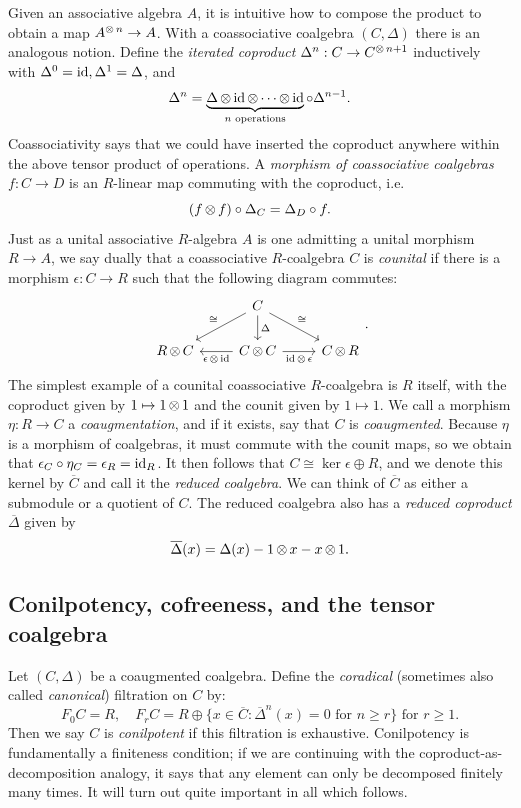 Given an associative algebra $A$, it is intuitive how to compose the product to obtain a map $A^{\operatorname{\otimes} n} \to A$. With a coassociative coalgebra $(C,\Delta)$ there is an analogous notion. Define the \emph{iterated coproduct} $\Delta^n: C\to C^{\operatorname{\otimes} n+1}$ inductively with $\Delta^0 = \operatorname{id}, \Delta^1 = \Delta$, and 
\[\Delta^n = \underbrace{\Delta \operatorname{\otimes} \operatorname{id} \operatorname{\otimes} \cdots \operatorname{\otimes} \operatorname{id}}_{\text{$n$ operations}} \circ \Delta^{n-1}.\]
Coassociativity says that we could have inserted the coproduct anywhere within the above tensor product of operations.
A \textit{morphism of coassociative coalgebras} $f: C\to D$ is an $R$-linear map commuting with the coproduct, i.e. 
\[(f\operatorname{\otimes} f)\circ \Delta_C = \Delta_D \circ f.\]
Just as a unital associative $R$-algebra $A$ is one admitting a unital morphism $R\to A$, we say dually that a coassociative $R$-coalgebra $C$ is \textit{counital} if there is a morphism $\epsilon: C\to R$ such that the following diagram commutes:
\[\begin{tikzcd}
	& C \\
	{R\tensor C} & {C\tensor C} & {C\tensor R}
	\arrow["\cong"', from=1-2, to=2-1]
	\arrow["\Delta", from=1-2, to=2-2]
	\arrow["\cong", from=1-2, to=2-3]
	\arrow["{\epsilon\tensor \id}", from=2-2, to=2-1]
	\arrow["{\id\tensor \epsilon}"', from=2-2, to=2-3]
\end{tikzcd}.\]
The simplest example of a counital coassociative $R$-coalgebra is $R$ itself, with the coproduct given by $1 \mapsto 1\operatorname{\otimes} 1$ and the counit given by $1\mapsto 1$. We call a morphism $\eta: R\to C$ a \textit{coaugmentation}, and if it exists, say that $C$ is \textit{coaugmented}. Because $\eta$ is a morphism of coalgebras, it must commute with the counit maps, so we obtain that $\epsilon_C\circ \eta_C= \epsilon_R = \operatorname{id}_R$. It then follows that $C \cong \ker \epsilon \oplus R$, and we denote this kernel by $\overline{C}$ and call it the \emph{reduced coalgebra}. We can think of $\overline{C}$ as either a submodule or a quotient of $C$. The reduced coalgebra also has a \emph{reduced coproduct} $\overline{\Delta}$ given by 
\[\overline{\Delta}(x) = \Delta(x) - 1\operatorname{\otimes} x - x\operatorname{\otimes} 1.\]

\subsection{Conilpotency, cofreeness, and the tensor coalgebra}
Let $(C,\Delta)$ be a coaugmented coalgebra. Define the \emph{coradical} (sometimes also called \emph{canonical}) filtration on $C$ by:
\[F_0C = R,\quad F_rC = R\oplus \{x\in \overline{C}: \overline{\Delta}^n(x) = 0\text{ for $n\geq r$}\}\text{ for $r\geq 1$}.\]
Then we say $C$ is \emph{conilpotent} if this filtration is exhaustive. Conilpotency is fundamentally a finiteness condition; if we are continuing with the coproduct-as-decomposition analogy, it says that any element can only be decomposed finitely many times. It will turn out quite important in all which follows.

